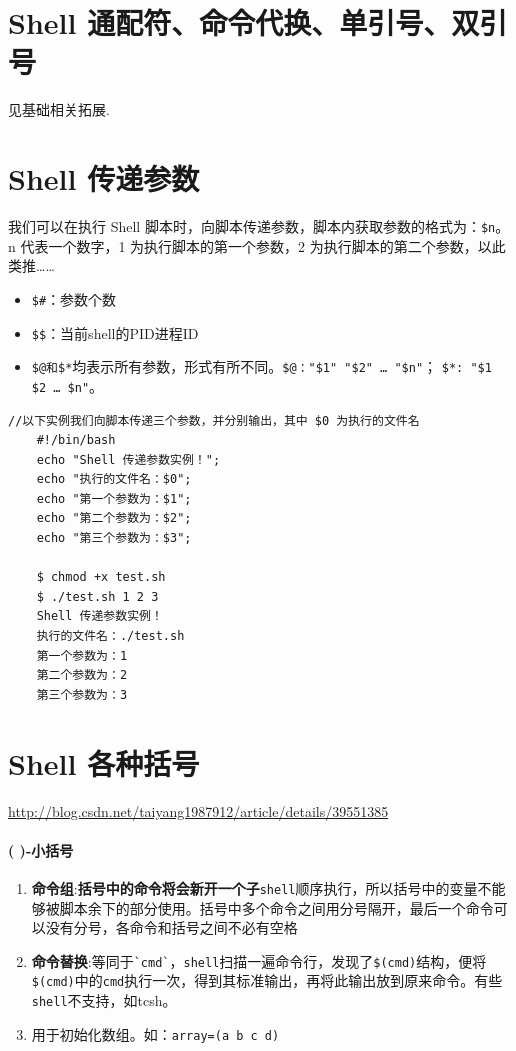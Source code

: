 \documentclass[UTF8,a4paper,12pt]{ctexbook}
\begin{document}
		 \section{Shell 通配符、命令代换、单引号、双引号}
			 见基础相关拓展.
	 
		 \section{Shell 传递参数}
			 我们可以在执行 Shell 脚本时，向脚本传递参数，脚本内获取参数的格式为：\verb|$n|。n 代表一个数字，1 为执行脚本的第一个参数，2 为执行脚本的第二个参数，以此类推……
			 
			 \begin{itemize}
			 	\item  \verb|$#|：参数个数
			 	\item  \verb|$$|：当前shell的PID进程ID
			 	\item  \verb|$@和$*|均表示所有参数，形式有所不同。\verb|$@："$1" "$2" … "$n"|； \verb|$*: "$1 $2 … $n"|。
			 \end{itemize}
			 
			 \begin{lstlisting}[xleftmargin=.06\textwidth]
	//以下实例我们向脚本传递三个参数，并分别输出，其中 $0 为执行的文件名
	#!/bin/bash	
	echo "Shell 传递参数实例！";
	echo "执行的文件名：$0";
	echo "第一个参数为：$1";
	echo "第二个参数为：$2";
	echo "第三个参数为：$3";
	
	$ chmod +x test.sh 
	$ ./test.sh 1 2 3
	Shell 传递参数实例！
	执行的文件名：./test.sh
	第一个参数为：1
	第二个参数为：2
	第三个参数为：3
			 \end{lstlisting}
			 
		\section{Shell 各种括号}
			\url{http://blog.csdn.net/taiyang1987912/article/details/39551385}
			\paragraph{( )-小括号}
				\begin{enumerate}
					\item \textbf{命令组}:\textbf{括号中的命令将会新开一个子}\verb|shell|顺序执行，所以括号中的变量不能够被脚本余下的部分使用。括号中多个命令之间用分号隔开，最后一个命令可以没有分号，各命令和括号之间不必有空格
					\item \textbf{命令替换}:等同于\verb|`cmd`|，\verb|shell|扫描一遍命令行，发现了\verb|$(cmd)|结构，便将\verb|$(cmd)|中的\verb|cmd|执行一次，得到其标准输出，再将此输出放到原来命令。有些\verb|shell|不支持，如tcsh。
					\item 用于初始化数组。如：\verb|array=(a b c d)|
				\end{enumerate}
\end{document}
